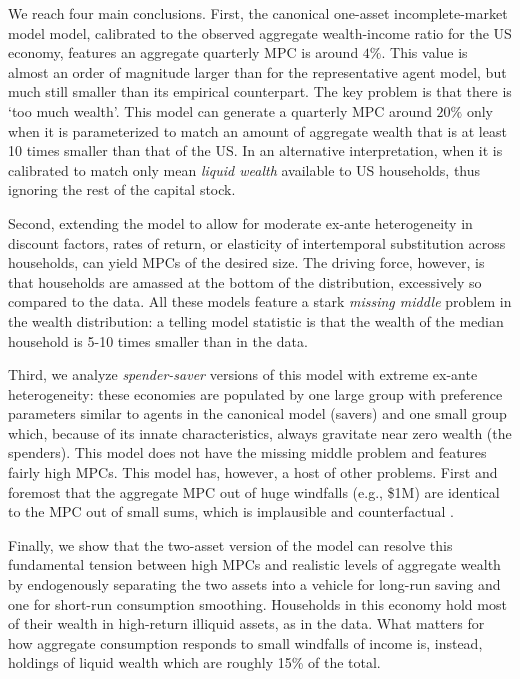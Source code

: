 We reach four main conclusions. First, the canonical one-asset incomplete-market model model, calibrated to the observed aggregate wealth-income ratio for the US economy, features an aggregate quarterly MPC is around $4\%$. This value is almost an order of magnitude larger than for the representative agent model, but much still smaller than its empirical counterpart. The key problem is that there is `too much wealth'. This model can generate a quarterly MPC around $20\%$ only when it is parameterized to match an amount of aggregate wealth that is at least 10  times smaller than that of the US. In an alternative interpretation, when it is calibrated to match only mean \textit{liquid wealth} available to US households, thus ignoring the rest of the capital stock. 

Second, extending the model to allow for moderate ex-ante heterogeneity in discount factors, rates of return, or elasticity of intertemporal substitution across households, can yield MPCs of the desired size. The driving force, however, is that households are amassed at the bottom of the distribution, excessively so compared to the data. All these models feature a stark \textit{missing middle} problem in the wealth distribution: a telling model statistic is that the wealth of the median household is 5-10 times smaller than in the data.

Third, we analyze \textit{spender-saver} versions of this model with extreme ex-ante heterogeneity: these economies are populated by one large group with preference parameters similar to agents in the canonical model (savers) and one small group which, because of its innate characteristics, always gravitate near zero wealth (the spenders). This model does not have the missing middle problem and features fairly high MPCs. This model has, however, a host of other problems. First and foremost that the aggregate MPC out of huge windfalls (e.g., \$1M) are identical to the MPC out of small sums, which is implausible and counterfactual \citep{fagereng2019mpc}.

Finally, we show that the two-asset version of the model can resolve this fundamental tension between high MPCs and realistic levels of aggregate wealth by endogenously separating the two assets into a vehicle for long-run saving and one for short-run consumption smoothing. Households in this economy hold most of their wealth in high-return illiquid assets, as in the data. What matters for how aggregate consumption responds to small windfalls of income is, instead, holdings of liquid wealth which are roughly 15\% of the total. 


